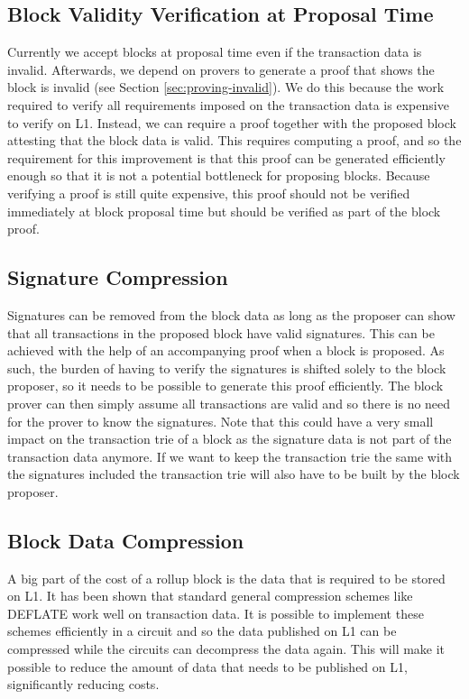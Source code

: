 \documentclass[9pt,oneside]{amsart}
\begin{document}
\begin{multicols}{2}
\subsection{Block Validity Verification at Proposal Time}\label{sec:propose-proof}
Currently we accept blocks at proposal time even if the transaction data is invalid. Afterwards, we depend on provers to generate a proof that shows the block is invalid (see Section \ref{sec:proving-invalid}). We do this because the work required to verify all requirements imposed on the transaction data is expensive to verify on L1. Instead, we can require a proof together with the proposed block attesting that the block data is valid. This requires computing a proof, and so the requirement for this improvement is that this proof can be generated efficiently enough so that it is not a potential bottleneck for proposing blocks. Because verifying a proof is still quite expensive, this proof should not be verified immediately at block proposal time but should be verified as part of the block proof.

\subsection{Signature Compression}\label{sec:signature-opt}
Signatures can be removed from the block data as long as the proposer can show that all transactions in the proposed block have valid signatures. This can be achieved with the help of an accompanying proof when a block is proposed. As such, the burden of having to verify the signatures is shifted solely to the block proposer, so it needs to be possible to generate this proof efficiently. The block prover can then simply assume all transactions are valid and so there is no need for the prover to know the signatures. Note that this could have a very small impact on the transaction trie of a block as the signature data is not part of the transaction data anymore. If we want to keep the transaction trie the same with the signatures included the transaction trie will also have to be built by the block proposer.

\subsection{Block Data Compression}\label{sec:compression}
A big part of the cost of a rollup block is the data that is required to be stored on L1. It has been shown that standard general compression schemes like DEFLATE \cite{deflate} work well on transaction data. It is possible to implement these schemes efficiently in a circuit and so the data published on L1 can be compressed while the circuits can decompress the data again. This will make it possible to reduce the amount of data that needs to be published on L1, significantly reducing costs.


\end{multicols}
\end{document}
